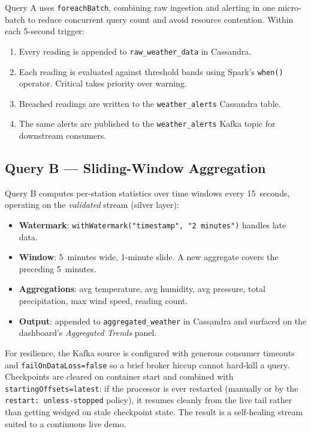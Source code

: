 \documentclass[conference,a4paper]{IEEEtran}
\begin{document}
Query A uses \texttt{foreachBatch}, combining raw ingestion and alerting in one
micro-batch to reduce concurrent query count and avoid resource contention.
Within each 5-second trigger:
\begin{enumerate}
  \item Every reading is appended to \texttt{raw\_weather\_data} in Cassandra.
  \item Each reading is evaluated against threshold bands using Spark's \texttt{when()} operator. Critical takes priority over warning.
  \item Breached readings are written to the \texttt{weather\_alerts} Cassandra table.
  \item The same alerts are published to the \texttt{weather\_alerts} Kafka topic for downstream consumers.
\end{enumerate}

\subsection{Query B --- Sliding-Window Aggregation}

Query B computes per-station statistics over time windows every 15~seconds,
operating on the \emph{validated} stream (silver layer):
\begin{itemize}
  \item \textbf{Watermark}: \texttt{withWatermark("timestamp", "2 minutes")} handles late data.
  \item \textbf{Window}: 5~minutes wide, 1-minute slide. A new aggregate covers the preceding 5~minutes.
  \item \textbf{Aggregations}: avg temperature, avg humidity, avg pressure, total precipitation, max wind speed, reading count.
  \item \textbf{Output}: appended to \texttt{aggregated\_weather} in Cassandra and surfaced on the dashboard's \emph{Aggregated Trends} panel.
\end{itemize}

For resilience, the Kafka source is configured with generous consumer timeouts
and \texttt{failOnDataLoss=false} so a brief broker hiccup cannot hard-kill a
query. Checkpoints are cleared on container start and combined with
\texttt{startingOffsets=latest}: if the processor is ever restarted (manually or
by the \texttt{restart: unless-stopped} policy), it resumes cleanly from the live
tail rather than getting wedged on stale checkpoint state. The result is a
self-healing stream suited to a continuous live demo.
\end{document}
